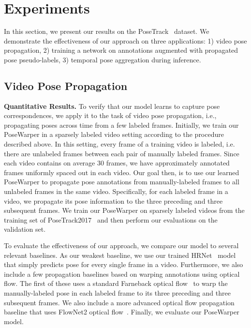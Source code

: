 \documentclass{article}
\begin{document}
\section{Experiments}



In this section, we present our results on the PoseTrack~\cite{Iqbal_CVPR2017} dataset. We demonstrate the effectiveness of our approach on three applications: 1) video pose propagation, 2) training a network on annotations augmented with propagated pose pseudo-labels, 3) temporal pose aggregation during inference. 















\subsection{Video Pose Propagation}


\textbf{Quantitative Results.} To verify that our model learns to capture pose correspondences, we apply it to the task of video pose propagation, i.e., propagating poses across time from a few labeled frames. Initially, we train our PoseWarper in a sparsely labeled video setting according to the procedure described above. In this setting, every  frame of a training video is labeled, i.e. there are  unlabeled frames between each pair of manually labeled frames.  Since each video contains on average 30 frames, we have approximately  annotated frames uniformly spaced out in each video. Our goal then, is to use our learned PoseWarper to propagate pose annotations from manually-labeled frames to all unlabeled frames in the same video. Specifically, for each labeled frame in a video, we propagate its pose information to the three preceding and three subsequent frames. We train our PoseWarper on sparsely labeled videos from the training set of PoseTrack2017~\cite{Iqbal_CVPR2017} and then perform our evaluations on the validation set.












To evaluate the effectiveness of our approach, we compare our model to several relevant baselines. As our weakest baseline, we use our trained HRNet~\cite{sun2019deep} model that simply predicts pose for every single frame in a video. Furthermore, we also include a few propagation baselines based on warping annotations using optical flow. The first of these uses a standard Farneback optical flow~\cite{Farneback:2003:TME:1763974.1764031} to warp the manually-labeled pose in each labeled frame to its three preceding and three subsequent frames. We also include a more advanced optical flow propagation baseline that uses FlowNet2 optical flow~\cite{DBLP:journals/corr/IlgMSKDB16}. Finally, we evaluate our PoseWarper model. 
\end{document}
